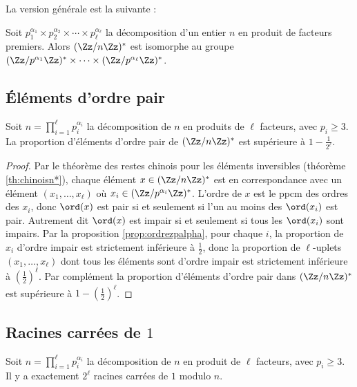 \documentclass[11pt,class=report,crop=false]{standalone}
\begin{document}
La version générale est la suivante :
\begin{theoreme}
\label{th:chinoisn*}
Soit $p_1^{\alpha_1} \times p_2^{\alpha_2} \times \cdots \times p_\ell^{\alpha_\ell}$ la décomposition d'un entier $n$ en produit de facteurs premiers.
Alors $(\Zz/n\Zz)^*$ est isomorphe au groupe
$(\Zz/p^{\alpha_1}\Zz)^* \times \cdots \times  (\Zz/p^{\alpha_\ell}\Zz)^*$.
\end{theoreme}

\subsection{\'Eléments d'ordre pair}

\begin{proposition}
\label{prop:ordrezn}
Soit $n = \prod_{i=1}^\ell p_i^{\alpha_i}$ la décomposition de $n$ en produits de $\ell$ facteurs, avec $p_i\ge3$. 
La proportion d'éléments d'ordre pair de $(\Zz/n\Zz)^*$ est supérieure à $1-\frac{1}{2^\ell}$.
\end{proposition}

\begin{proof}
Par le théorème des restes chinois pour les éléments inversibles (théorème \ref{th:chinoisn*}), chaque élément $x \in (\Zz/n\Zz)^*$
est en correspondance avec un élément $(x_1,\ldots,x_\ell)$ où $x_i \in (\Zz/p^{\alpha_i}\Zz)^*$. 
L'ordre de $x$ est le ppcm des ordres des $x_i$, donc $\ord(x)$ est pair si et seulement si l'un au moins des $\ord(x_i)$ est pair.
Autrement dit $\ord(x)$ est impair si et seulement si tous les $\ord(x_i)$ sont impairs.
Par la proposition \ref{prop:ordrezpalpha}, pour chaque $i$, la proportion de $x_i$ d'ordre impair est strictement inférieure à $\frac12$, donc la proportion de $\ell$-uplets $(x_1,\ldots,x_\ell)$ dont tous les éléments sont d'ordre impair est strictement inférieure à $\left(\frac12\right)^\ell$. 
Par complément la proportion d'éléments d'ordre pair dans $(\Zz/n\Zz)^*$ est supérieure à $1-\left(\frac12\right)^\ell$.  
\end{proof}

\subsection{Racines carrées de $1$}

\begin{proposition}
\label{prop:racinezn}
Soit $n = \prod_{i=1}^\ell p_i^{\alpha_i}$ la décomposition de $n$ en produit de $\ell$ facteurs, avec $p_i\ge3$. 
Il y a exactement $2^\ell$ racines carrées de $1$ modulo $n$.
\end{proposition}
\end{document}

